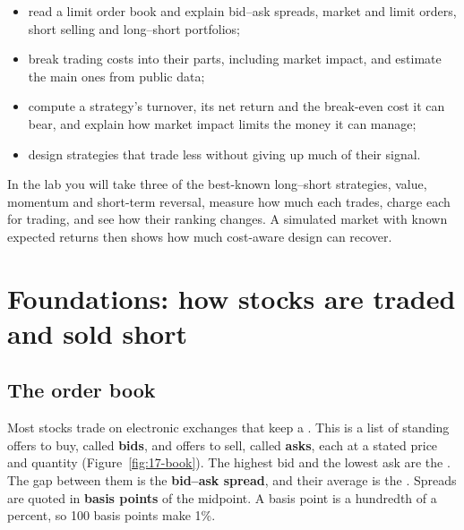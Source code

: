 \begin{itemize}
  \item read a limit order book and explain bid--ask spreads, market and limit orders, short selling and long--short portfolios;
  \item break trading costs into their parts, including market impact, and estimate the main ones from public data;
  \item compute a strategy's turnover, its net return and the break-even cost it can bear, and explain how market impact limits the money it can manage;
  \item design strategies that trade less without giving up much of their signal.
\end{itemize}


In the lab you will take three of the best-known long--short strategies, value, momentum and short-term reversal, measure how much each trades, charge each for trading, and see how their ranking changes. A simulated market with known expected returns then shows how much cost-aware design can recover.

\section{Foundations: how stocks are traded and sold short}
\label{sec:17-foundations}

\subsection{The order book}

Most stocks trade on electronic exchanges that keep a . This is a list of standing offers to buy, called \textbf{bids}, and offers to sell, called \textbf{asks}, each at a stated price and quantity (Figure~\ref{fig:17-book}). The highest bid and the lowest ask are the . The gap between them is the \textbf{bid--ask spread}, and their average is the . Spreads are quoted in \textbf{basis points} of the midpoint. A basis point is a hundredth of a percent, so 100 basis points make 1\%.

